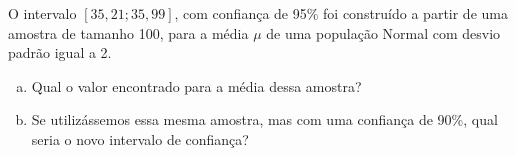 %
%


\begin{exercicioBanco}[\valorquestao]
    O intervalo \([35,21; 35,99]\), com confiança de 95\% foi construído a partir de uma amostra de tamanho 100, para a média \(\mu\) de uma população Normal com desvio padrão igual a 2.
    \begin{enumerate}[(a)]
        \item Qual o valor encontrado para a média dessa amostra?
        \item Se utilizássemos essa mesma amostra, mas com uma confiança de 90\%, qual seria o novo intervalo de confiança?
    \end{enumerate}
\end{exercicioBanco}

